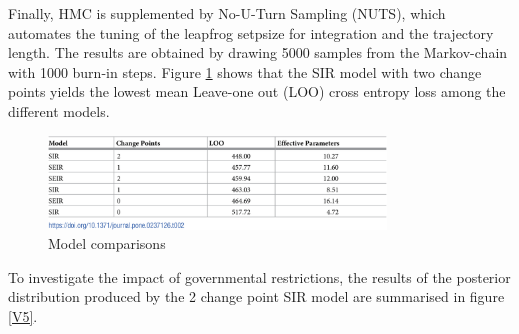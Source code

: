 Finally, HMC is supplemented by No-U-Turn Sampling (NUTS), which automates the tuning of the leapfrog setpsize for integration and the trajectory length. 
\newline \newline 
The results are obtained by drawing 5000 samples from the Markov-chain with 1000 burn-in steps. Figure \ref{V3} shows that the SIR model with two change points yields the lowest mean Leave-one out (LOO) cross entropy loss among the different models.
\begin{figure}[h]
	\centering
	\includegraphics[width = 0.8\textwidth]{V3}
	\caption{Model comparisons \cite{Bayes}}
	\label{V3}
\end{figure}
To investigate the impact of governmental restrictions, the results of the posterior distribution produced by the 2 change point SIR model are summarised in figure \ref{V5}.

